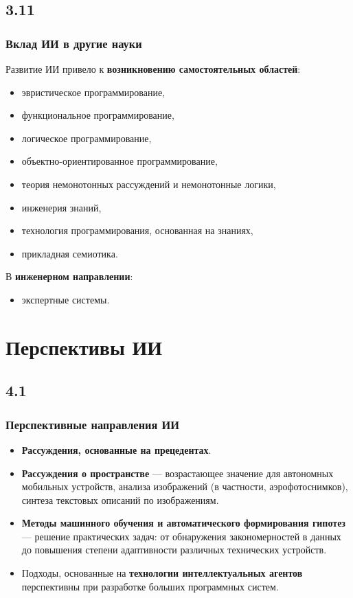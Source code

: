\documentclass[default]{beamer}
\begin{document}
	\subsection{3.11}
	\begin{frame}
		\frametitle{Вклад ИИ в другие  науки}
		
		Развитие ИИ привело к \textbf{возникновению самостоятельных областей}:
		\begin{itemize}
			\item эвристическое программирование,
			\item функциональное программирование,
			\item логическое программирование,
			\item объектно-ориентированное программирование,
			\item теория немонотонных рассуждений и немонотонные логики,
			\item инженерия знаний,
			\item технология программирования, основанная на знаниях,
			\item прикладная семиотика.
		\end{itemize}
		
		В \textbf{инженерном направлении}:
		\begin{itemize}
			\item экспертные системы.
		\end{itemize}
	\end{frame}

	\section{Перспективы ИИ}
	\subsection{4.1}
	\begin{frame}
		\frametitle{Перспективные направления ИИ}
		
		\begin{itemize}
			\item \textbf{Рассуждения, основанные на прецедентах}.
			\item \textbf{Рассуждения о пространстве} --- возрастающее значение для автономных мобильных устройств, анализа изображений (в частности, аэрофотоснимков), синтеза текстовых описаний по изображениям.
			\item \textbf{Методы машинного обучения и автоматического формирования гипотез} --- решение практических задач: от обнаружения  закономерностей в данных до повышения степени адаптивности различных технических устройств.
			\item Подходы, основанные на \textbf{технологии интеллектуальных агентов} перспективны при разработке больших программных систем.
			
		\end{itemize}
		
	\end{frame}
\end{document}
